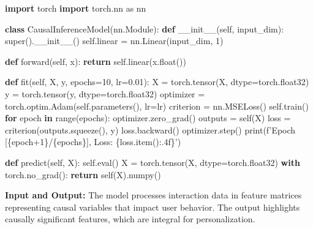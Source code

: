 \documentclass{article} %
\begin{document}
\begin{algorithm}
\caption{CausalInferenceModel}
\label{alg:causal_inference_model}
\begin{algorithmic}[1]

\STATE \textbf{import} torch
\STATE \textbf{import} torch.nn as nn

\STATE
\STATE \textbf{class} CausalInferenceModel(nn.Module):
\STATE \hspace{0.5cm} \textbf{def} \_\_init\_\_(self, input\_dim):
\STATE \hspace{1cm} super().\_\_init\_\_()
\STATE \hspace{1cm} self.linear = nn.Linear(input\_dim, 1)

\STATE
\STATE \hspace{0.5cm} \textbf{def} forward(self, x):
\STATE \hspace{1cm} \textbf{return} self.linear(x.float())

\STATE
\STATE \hspace{0.5cm} \textbf{def} fit(self, X, y, epochs=10, lr=0.01):
\STATE \hspace{1cm} X = torch.tensor(X, dtype=torch.float32)
\STATE \hspace{1cm} y = torch.tensor(y, dtype=torch.float32)
\STATE \hspace{1cm} optimizer = torch.optim.Adam(self.parameters(), lr=lr)
\STATE \hspace{1cm} criterion = nn.MSELoss()
\STATE \hspace{1cm} self.train()
\STATE \hspace{1cm} \textbf{for} epoch \textbf{in} range(epochs):
\STATE \hspace{1.5cm} optimizer.zero\_grad()
\STATE \hspace{1.5cm} outputs = self(X)
\STATE \hspace{1.5cm} loss = criterion(outputs.squeeze(), y)
\STATE \hspace{1.5cm} loss.backward()
\STATE \hspace{1.5cm} optimizer.step()
\STATE \hspace{1.5cm} print(f'Epoch [\{epoch+1\}/\{epochs\}], Loss: \{loss.item():.4f\}')

\STATE
\STATE \hspace{0.5cm} \textbf{def} predict(self, X):
\STATE \hspace{1cm} self.eval()
\STATE \hspace{1cm} X = torch.tensor(X, dtype=torch.float32)
\STATE \hspace{1cm} \textbf{with} torch.no\_grad():
\STATE \hspace{1.5cm} \textbf{return} self(X).numpy()

\end{algorithmic}
\end{algorithm}
\textbf{Input and Output:} The model processes interaction data in feature matrices representing causal variables that impact user behavior. The output highlights causally significant features, which are integral for personalization.
\end{document}
